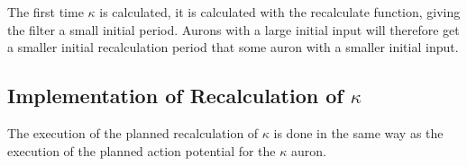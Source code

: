 		



%
%
 		The first time $\kappa$ is calculated, it is calculated with the recalculate function, giving the filter a small initial period. %
		Aurons with a large initial input will therefore get a smaller initial recalculation period that some auron with a smaller initial input. %

		\subsection{Implementation of Recalculation of $\kappa$}
		The execution of the planned recalculation of $\kappa$ is done in the same way as the execution of the planned action potential for the $\kappa$ auron.
		
